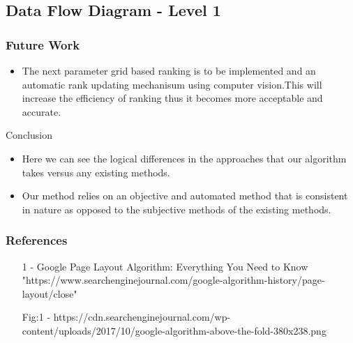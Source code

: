 \documentclass[11pt]{beamer}
\begin{document}
\subsection{Data Flow Diagram - Level 1}
\begin{frame}
\frametitle{Future Work}
	\begin{itemize}
\item The next parameter grid based ranking is to be implemented and an automatic rank updating mechanisum using computer vision.This will increase the efficiency of ranking thus it becomes more acceptable and accurate.
	\end{itemize}
\end{frame}
	\begin{frame}{Conclusion}
		\begin{itemize}
			\item Here we can see the logical differences in the approaches that our algorithm takes versus any existing methods.
			\item Our method relies on an objective and automated method that is consistent in nature as opposed to the subjective methods of the existing methods.
		\end{itemize}
	\end{frame}
	\begin{frame}
		\frametitle{\LARGE \textbf{References}}
		\begin{itemize}
			\item [1] - Google Page Layout Algorithm: Everything You Need to Know 
			"https://www.searchenginejournal.com/google-algorithm-history/page-layout/close"
			\item [Fig:1] - https://cdn.searchenginejournal.com/wp-content/uploads/2017/10/google-algorithm-above-the-fold-380x238.png
		
		\end{itemize}
	\end{frame}
\end{document}
